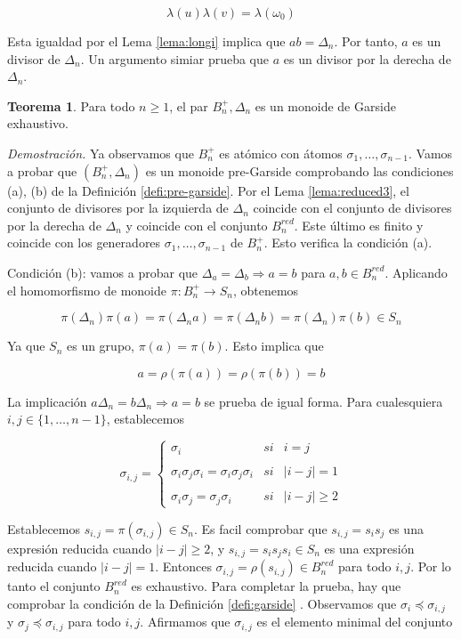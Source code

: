 \documentclass[12pt]{article}
\theoremstyle{definition}
\newtheorem{teor}{Teorema}[section]
\begin{document}
$$\lambda(u)\lambda(v)=\lambda(\omega_0)$$

Esta igualdad por el Lema \ref{lema:longi} implica que $ab=\Delta_n$. Por tanto, $a$ es un divisor de $\Delta_n$. Un argumento simiar prueba que $a$ es un divisor por la derecha de $\Delta_n$.

\begin{teor}
Para todo $n\geq 1$, el par $B_n^+,\Delta_n$ es un monoide de Garside exhaustivo.
\end{teor}

\textit{Demostración.} Ya observamos que $B_n^+$ es atómico con átomos $\sigma_1,\ldots,\sigma_{n-1}$. Vamos a probar que $(B_n^+,\Delta_n)$ es un monoide pre-Garside comprobando las condiciones (a), (b) de la Definición \ref{defi:pre-garside}.
\newline
\newline
Por el Lema \ref{lema:reduced3}, el conjunto de divisores por la izquierda de $\Delta_n$ coincide con el conjunto de divisores por la derecha de $\Delta_n$ y coincide con el conjunto $B_n^{red}$. Este último es finito y coincide con los generadores $\sigma_1,\ldots,\sigma_{n-1}$ de $B_n^+$. Esto verifica la condición (a).

Condición (b): vamos a probar que $\Delta_a=\Delta_b\Rightarrow a=b$ para $a,b\in B_n^{red}.$ Aplicando el homomorfismo de monoide $\pi: B_n^+\rightarrow S_n$, obtenemos

$$\pi(\Delta_n)\pi(a)=\pi(\Delta_n a)=\pi(\Delta_n b)=\pi(\Delta_n)\pi(b)\in S_n$$

Ya que $S_n$ es un grupo, $\pi(a)=\pi(b)$. Esto implica que

$$a=\rho(\pi(a))=\rho(\pi(b))=b$$

La implicación $a\Delta_n=b\Delta_n\Rightarrow a=b$ se prueba de igual forma.
\newline
\newline
Para cualesquiera $i,j\in\{1,\ldots,n-1\}$, establecemos

$$\sigma_{i,j}= \left\{ \begin{array}{lcc}
             \sigma_i &   si  & i=j \\
             \\ \sigma_i\sigma_j\sigma_i=\sigma_i\sigma_j\sigma_i &  si & |i-j|=1 \\
             \\ \sigma_i\sigma_j=\sigma_j\sigma_i &  si  & |i-j|\geq 2
             \end{array}
   \right.$$
   
Establecemos $s_{i,j}=\pi(\sigma_{i,j})\in S_n$. Es facil comprobar que $s_{i,j}=s_is_j$ es una expresión reducida cuando $|i-j|\geq 2$, y $s_{i,j}=s_is_js_i\in S_n$ es una expresión reducida cuando $|i-j|=1$. Entonces $\sigma_{i,j}=\rho(s_{i,j})\in B_n^{red}$ para todo $i,j$. Por lo tanto el conjunto $B_n^{red}$ es exhaustivo.
\newline
\newline
Para completar la prueba, hay que comprobar la condición de la Definición \ref{defi:garside}
. Observamos que $\sigma_i\preceq \sigma_{i,j}$ y $\sigma_j\preceq\sigma_{i,j}$ para todo $i,j$. Afirmamos que $\sigma_{i,j}$ es el elemento minimal del conjunto
\end{document}
